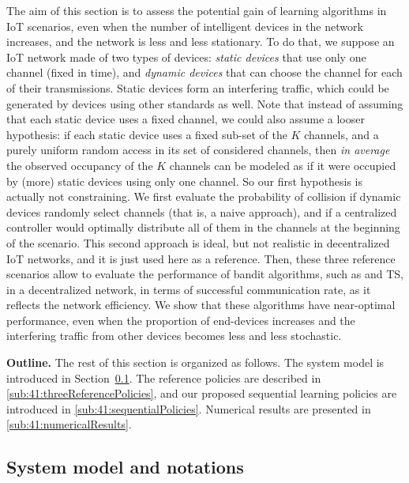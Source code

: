 The aim of this section is to assess the potential gain of learning algorithms in IoT scenarios, even when the number of intelligent devices in the network increases,
and the network is less and less stationary.
To do that, we suppose an IoT network made of two types of devices: \emph{static devices} that use only one channel (fixed in time), and \emph{dynamic devices} that can choose the channel for each of their transmissions. Static devices form an interfering traffic, which could be generated by devices using other standards as well.
Note that instead of assuming that each static device uses a fixed channel, we could also assume a looser hypothesis: if each static device uses a fixed sub-set of the $K$ channels, and a purely uniform random access in its set of considered channels, then \emph{in average} the observed occupancy of the $K$ channels can be modeled as if it were occupied by (more) static devices using only one channel. So our first hypothesis is actually not constraining.
We first evaluate the probability of collision if dynamic devices randomly select channels (that is, a naive approach), and if a centralized controller would optimally distribute all of them in the channels at the beginning of the scenario.
This second approach is ideal, but not realistic in decentralized IoT networks, and it is just used here as a reference.
Then, these three reference scenarios allow to evaluate the performance of bandit algorithms, such as \UCB{} and TS, in a decentralized network, in terms of successful communication rate, as it reflects the network efficiency.
We show that these algorithms have near-optimal performance, even when the proportion of end-devices increases and the interfering traffic from other devices becomes less and less stochastic.


\textbf{Outline.}
%
The rest of this section is organized as follows. The system model is introduced in Section~\ref{sub:41:systemModel}. The reference policies are described in \ref{sub:41:threeReferencePolicies}, and our proposed sequential learning policies are introduced in \ref{sub:41:sequentialPolicies}.
Numerical results are presented in \ref{sub:41:numericalResults}.


\subsection{System model and notations}\label{sub:41:systemModel}

